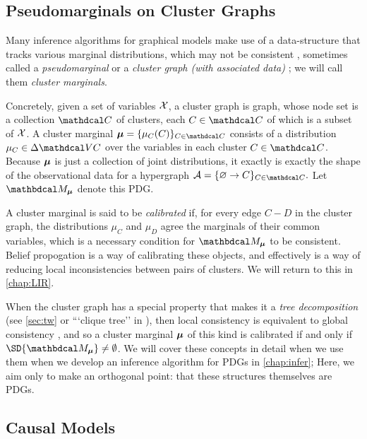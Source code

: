 \subsection{Pseudomarginals on Cluster Graphs}

Many inference algorithms for graphical models make use of a data-structure that tracks various marginal distributions, which may not be consistent \cite{wainwright2003tree,wainwright2008graphical,koller2009probabilistic},
sometimes called a \emph{pseudomarginal} \cite{wainwright2008graphical} or a \emph{cluster graph (with associated data)} \cite{koller2009probabilistic}; we will call them \emph{cluster marginals}.

Concretely, given a set of variables $\mathcal X$, a cluster graph is 
graph, whose node set is a collection $\C$ of clusters, each $C \in \C$ of which is a subset of $\mathcal X$. 
A cluster marginal $\bmu = \{ \mu_C(C) \}_{C \in \C}$ consists of a distribution $\mu_C \in \Delta \V C$ over the variables in each cluster $C \in \C$.
Because $\boldsymbol\mu$ is just a collection of joint distributions, it exactly
    is exactly the shape of the observational data for a hypergraph
$
    \Ar = \{ \varnothing \to C \}_{C \in \C}.
$
Let $\dg M_{\bmu}$ denote this PDG.
 
A cluster marginal is said to be \emph{calibrated} if, for every edge $C{-}D$ in the cluster graph, the distributions $\mu_C$ and $\mu_D$ agree the marginals of their common variables, which is a necessary condition for $\dg M_{\bmu}$ to be consistent.
Belief propogation is a way of calibrating these objects, and effectively is a way of reducing local inconsistencies between pairs of clusters. We will return to this in \cref{chap:LIR}. 

When the cluster graph has a special property that makes it a \emph{tree decomposition} 
    (see \cref{sec:tw} or ```clique tree'' in \cite{koller2009probabilistic}),
then local consistency is equivalent to global consistency \cite{wainwright2008graphical},
and so a cluster marginal $\boldsymbol\mu$ of this kind is calibrated if and only if $\SD{\dg M_{\bmu}} \ne \emptyset$.
We will cover these concepts in detail when we
    use them when we develop an inference algorithm for PDGs in \cref{chap:infer};
Here, we aim only to make an orthogonal point: that these structures themselves are PDGs. 

\subsection{Causal Models}
    \label{ssec:capture-causal-models}
    
